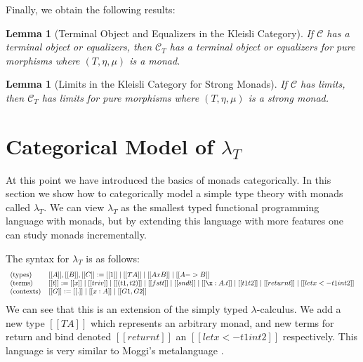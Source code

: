\documentclass{article}
\let\to\relax
\newcommand{\to}{\rightarrow}
\newcommand{\cat}[1]{\mathcal{#1}}
\newtheorem{lemma}[theorem]{Lemma}
\begin{document}
Finally, we obtain the following results:
\begin{lemma}[Terminal Object and Equalizers in the Kleisli Category]
  \label{lemma:terminal_object_and_equalizers_in_the_kleisli_category}
  If $\cat{C}$ has a terminal object or equalizers, then $\cat{C}_T$
  has a terminal object or equalizers for pure morphisms where
  $(T,\eta,\mu)$ is a monad.
\end{lemma}

\begin{lemma}[Limits in the Kleisli Category for Strong Monads]
  \label{lemma:limits_in_the_kleisli_category_strong_monads}
  If $\cat{C}$ has limits, then $\cat{C}_T$ has limits for pure
  morphisms where $(T,\eta,\mu)$ is a strong monad.
\end{lemma}



\section{Categorical Model of $\lambda_T$}
\label{sec:categorical_model_of_lambdaT}

At this point we have introduced the basics of monads categorically.
In this section we show how to categorically model a simple type
theory with monads called $\lambda_T$.  We can view $\lambda_T$ as the
smallest typed functional programming language with monads, but by
extending this language with more features one can study monads
incrementally.

The syntax for $\lambda_T$ is as follows:
\[
\small
\begin{array}{lll}
  \text{(types)}  & [[A]],[[B]],[[C]] := [[1]] \mid [[T A]] \mid [[A x B]] \mid [[A -> B]]\\
  \text{(terms)} & [[t]] := [[x]] \mid [[triv]] \mid [[(t1,t2)]] \mid [[fst t]] \mid [[snd t]] \mid [[\x:A.t]] \mid [[t1 t2]] \mid [[return t]] \mid [[let x <- t1 in t2]]\\
  \text{(contexts)} & [[G]] := [[.]] \mid [[x : A]] \mid [[G1,G2]]
\end{array}
\]
We can see that this is an extension of the simply typed
$\lambda$-calculus.  We add a new type $[[T A]]$ which represents an
arbitrary monad, and new terms for return and bind denoted $[[return
    t]]$ an $[[let x <- t1 in t2]]$ respectively.  This language is
very similar to Moggi's metalanguage \cite{Moggi:1988}.
\end{document}
